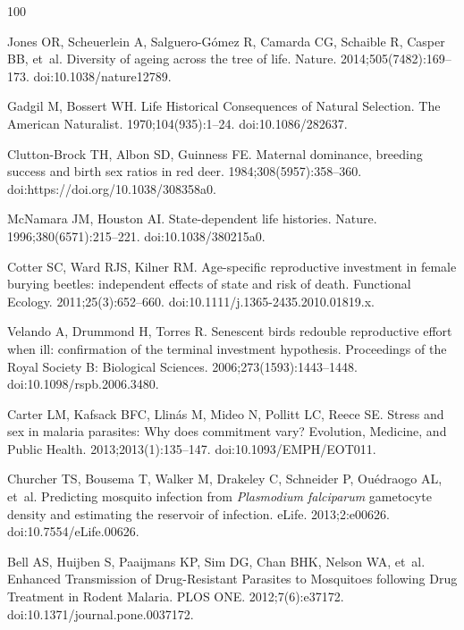 \documentclass[10pt,letterpaper]{article}
\begin{document}

\begin{thebibliography}{100}

Jones OR, Scheuerlein A, Salguero-Gómez R, Camarda CG, Schaible R, Casper BB, et~al.
\newblock Diversity of ageing across the tree of life.
\newblock Nature. 2014;505(7482):169--173.
\newblock doi:{10.1038/nature12789}.

Gadgil M, Bossert WH.
\newblock Life {Historical} {Consequences} of {Natural} {Selection}.
\newblock The American Naturalist. 1970;104(935):1--24.
\newblock doi:{10.1086/282637}.

Clutton-Brock TH, Albon SD, Guinness FE.
\newblock Maternal dominance, breeding success and birth sex ratios in red deer. 1984;308(5957):358--360.
\newblock doi:{https://doi.org/10.1038/308358a0}.

McNamara JM, Houston AI.
\newblock State-dependent life histories.
\newblock Nature. 1996;380(6571):215--221.
\newblock doi:{10.1038/380215a0}.

Cotter SC, Ward RJS, Kilner RM.
\newblock Age-specific reproductive investment in female burying beetles: independent effects of state and risk of death.
\newblock Functional Ecology. 2011;25(3):652--660.
\newblock doi:{10.1111/j.1365-2435.2010.01819.x}.

Velando A, Drummond H, Torres R.
\newblock Senescent birds redouble reproductive effort when ill: confirmation of the terminal investment hypothesis.
\newblock Proceedings of the Royal Society B: Biological Sciences. 2006;273(1593):1443--1448.
\newblock doi:{10.1098/rspb.2006.3480}.

Carter LM, Kafsack BFC, Llinás M, Mideo N, Pollitt LC, Reece SE.
\newblock Stress and sex in malaria parasites: {Why} does commitment vary?
\newblock Evolution, Medicine, and Public Health. 2013;2013(1):135--147.
\newblock doi:{10.1093/EMPH/EOT011}.

Churcher TS, Bousema T, Walker M, Drakeley C, Schneider P, Ouédraogo AL, et~al.
\newblock Predicting mosquito infection from \textit{{Plasmodium} falciparum} gametocyte density and estimating the reservoir of infection.
\newblock eLife. 2013;2:e00626.
\newblock doi:{10.7554/eLife.00626}.

Bell AS, Huijben S, Paaijmans KP, Sim DG, Chan BHK, Nelson WA, et~al.
\newblock Enhanced {Transmission} of {Drug}-{Resistant} {Parasites} to {Mosquitoes} following {Drug} {Treatment} in {Rodent} {Malaria}.
\newblock PLOS ONE. 2012;7(6):e37172.
\newblock doi:{10.1371/journal.pone.0037172}.


\end{thebibliography}
\end{document}
